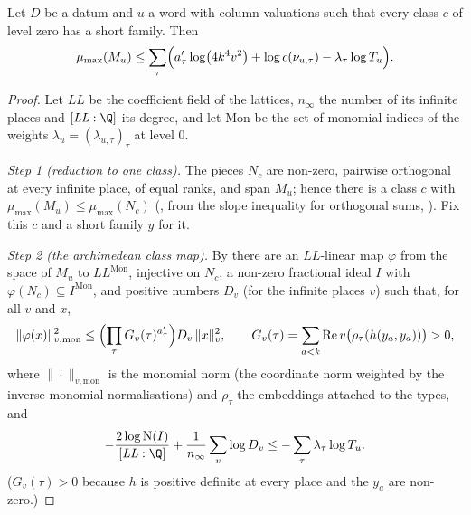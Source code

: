 \begin{theorem}\label{pf:top-shape:slopemaxgiven}
Let $D$ be a datum and $u$ a word with column valuations such that every class $c$ of level zero has a short family.
Then
\[
\mu_{\max}(M_u)\le\sum_\tau\Bigl(a'_\tau\log\bigl(4k^4v^2\bigr)+\log c(\nu_{u,\tau})-\lambda_\tau\log T_u\Bigr).
\]
\end{theorem}

\begin{proof}
Let $\mathit{LL}$ be the coefficient field of the lattices, $n_\infty$ the number of its infinite places and
$[\mathit{LL}:\Q]$ its degree, and let $\mathrm{Mon}$ be the set of monomial indices of the weights
$\lambda_u=(\lambda_{u,\tau})_\tau$ at level $0$.

\emph{Step 1 (reduction to one class).} The pieces $N_c$ are non-zero, pairwise orthogonal at every infinite place, of
equal ranks, and span $M_u$; hence there is a class $c$ with $\mu_{\max}(M_u)\le\mu_{\max}(N_c)$
(, from the slope inequality for orthogonal
sums, ). Fix this $c$ and a short family $y$ for it.

\emph{Step 2 (the archimedean class map).} By 
there are an $\mathit{LL}$-linear map $\varphi$ from the space of $M_u$ to $\mathit{LL}^{\mathrm{Mon}}$, injective on $N_c$, a
non-zero fractional ideal $I$ with $\varphi(N_c)\subseteq I^{\mathrm{Mon}}$, and positive numbers $D_v$ (for the infinite
places $v$) such that, for all $v$ and $x$,
\[
\|\varphi(x)\|_{v,\mathrm{mon}}^2\le\Bigl(\prod_\tau G_v(\tau)^{a'_\tau}\Bigr)D_v\,\|x\|_v^2,\qquad
G_v(\tau)=\sum_{a<k}\mathrm{Re}\,v\bigl(\rho_\tau(h(y_a,y_a))\bigr)>0,
\]
where $\|\cdot\|_{v,\mathrm{mon}}$ is the monomial norm (the coordinate norm weighted by the inverse monomial
normalisations) and $\rho_\tau$ the embeddings attached to the types, and
\[
-\frac{2\log\mathrm N(I)}{[\mathit{LL}:\Q]}+\frac1{n_\infty}\sum_v\log D_v\le-\sum_\tau\lambda_\tau\log T_u .
\]
($G_v(\tau)>0$ because $h$ is positive definite at every place and the $y_a$ are non-zero.)


\end{proof}
